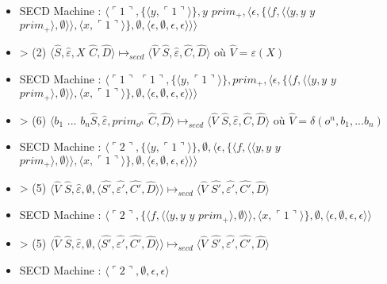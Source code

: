 \documentclass[10pt,a4paper]{report}
\begin{document}
\begin{itemize}
\item[] SECD Machine : $\langle\ulcorner 1\urcorner,\{\langle y,\ulcorner 1\urcorner\rangle\},y$ $prim_{+},\langle\epsilon,\{\langle f,\langle\langle y,y$ $y$ $prim_{+}\rangle,\emptyset\rangle\rangle,\langle x,\ulcorner 1\urcorner\rangle\} ,\emptyset,\langle\epsilon,\emptyset,\epsilon,\epsilon\rangle\rangle\rangle$
\item[] > (2) $\langle\widehat{S},\widehat{\varepsilon},X$ $\widehat{C},\widehat{D}\rangle \longmapsto_{secd} \langle \widehat{V}$ $\widehat{S},\widehat{\varepsilon},\widehat{C},\widehat{D}\rangle$ où $\widehat{V} = \varepsilon(X)$
\item[] SECD Machine : $\langle\ulcorner 1\urcorner$ $\ulcorner 1\urcorner,\{\langle y,\ulcorner 1\urcorner\rangle\},prim_{+},\langle\epsilon,\{\langle f,\langle\langle y,y$ $y$ $prim_{+}\rangle,\emptyset\rangle\rangle,\langle x,\ulcorner 1\urcorner\rangle\} ,\emptyset,\langle\epsilon,\emptyset,\epsilon,\epsilon\rangle\rangle\rangle$
\item[] > (6) $\langle b_{1}$ $...$ $b_{n}\widehat{S},\widehat{\varepsilon},prim_{o^{n}}$ $\widehat{C},\widehat{D}\rangle \longmapsto_{secd} \langle \widehat{V}$ $\widehat{S},\widehat{\varepsilon},\widehat{C},\widehat{D}\rangle$ où $\widehat{V} = \delta(o^{n},b_1,...b_{n})$
\item[] SECD Machine : $\langle\ulcorner 2\urcorner,\{\langle y,\ulcorner 1\urcorner\rangle\},\emptyset,\langle\epsilon,\{\langle f,\langle\langle y,y$ $y$ $prim_{+}\rangle,\emptyset\rangle\rangle,\langle x,\ulcorner 1\urcorner\rangle\} ,\emptyset,\langle\epsilon,\emptyset,\epsilon,\epsilon\rangle\rangle\rangle$
\item[] > (5) $\langle\widehat{V}$ $\widehat{S},\widehat{\varepsilon},\emptyset,\langle\widehat{S'},\widehat{\varepsilon'},\widehat{C'},\widehat{D}\rangle\rangle \longmapsto_{secd} \langle \widehat{V}$ $\widehat{S'},\widehat{\varepsilon'},\widehat{C'},\widehat{D}\rangle$
\item[] SECD Machine : $\langle\ulcorner 2\urcorner,\{\langle f,\langle\langle y,y$ $y$ $prim_{+}\rangle,\emptyset\rangle\rangle,\langle x,\ulcorner 1\urcorner\rangle\} ,\emptyset,\langle\epsilon,\emptyset,\epsilon,\epsilon\rangle\rangle$
\item[] > (5) $\langle\widehat{V}$ $\widehat{S},\widehat{\varepsilon},\emptyset,\langle\widehat{S'},\widehat{\varepsilon'},\widehat{C'},\widehat{D}\rangle\rangle \longmapsto_{secd} \langle \widehat{V}$ $\widehat{S'},\widehat{\varepsilon'},\widehat{C'},\widehat{D}\rangle$
\item[] SECD Machine : $\langle\ulcorner 2\urcorner,\emptyset,\epsilon,\epsilon\rangle$
\end{itemize}
\newpage
\end{document}
